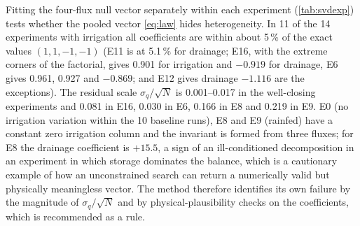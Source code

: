 Fitting the four-flux null vector separately within each experiment (\cref{tab:svdexp}) tests whether the pooled vector \cref{eq:law} hides heterogeneity. In 11 of the 14 experiments with irrigation all coefficients are within about 5\,\% of the exact values $(1,1,-1,-1)$ (E11 is at 5.1\,\% for drainage; E16, with the extreme corners of the factorial, gives 0.901 for irrigation and $-0.919$ for drainage, E6 gives 0.961, 0.927 and $-0.869$; and E12 gives drainage $-1.116$ are the exceptions). The residual scale $\sigma_q/\sqrt N$ is 0.001--0.017 in the well-closing experiments and 0.081 in E16, 0.030 in E6, 0.166 in E8 and 0.219 in E9. E0 (no irrigation variation within the 10 baseline runs), E8 and E9 (rainfed) have a constant zero irrigation column and the invariant is formed from three fluxes; for E8 the drainage coefficient is $+15.5$, a sign of an ill-conditioned decomposition in an experiment in which storage dominates the balance, which is a cautionary example of how an unconstrained search can return a numerically valid but physically meaningless vector. The method therefore identifies its own failure by the magnitude of $\sigma_q/\sqrt N$ and by physical-plausibility checks on the coefficients, which is recommended as a rule.

